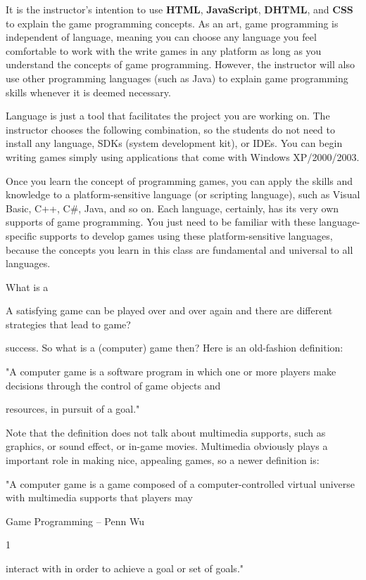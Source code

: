\documentclass[
]{article}
\begin{document}
It is the instructor's intention to use \textbf{HTML},
\textbf{JavaScript}, \textbf{DHTML}, and \textbf{CSS} to explain the
game programming concepts. As an art, game programming is independent of
language, meaning you can choose any language you feel comfortable to
work with the write games in any platform as long as you understand the
concepts of game programming. However, the instructor will also use
other programming languages (such as Java) to explain game programming
skills whenever it is deemed necessary.

Language is just a tool that facilitates the project you are working on.
The instructor chooses the following combination, so the students do not
need to install any language, SDKs (system development kit), or IDEs.
You can begin writing games simply using applications that come with
Windows XP/2000/2003.

Once you learn the concept of programming games, you can apply the
skills and knowledge to a platform-sensitive language (or scripting
language), such as Visual Basic, C++, C\#, Java, and so on. Each
language, certainly, has its very own supports of game programming. You
just need to be familiar with these language-specific supports to
develop games using these platform-sensitive languages, because the
concepts you learn in this class are fundamental and universal to all
languages.

What is a

A satisfying game can be played over and over again and there are
different strategies that lead to game?

success. So what is a (computer) game then? Here is an old-fashion
definition:

"A computer game is a software program in which one or more players make
decisions through the control of game objects and

resources, in pursuit of a goal."

Note that the definition does not talk about multimedia supports, such
as graphics, or sound effect, or in-game movies. Multimedia obviously
plays a important role in making nice, appealing games, so a newer
definition is:

"A computer game is a game composed of a computer-controlled virtual
universe with multimedia supports that players may

Game Programming -- Penn Wu

1

\protect\hypertarget{index_split_001.htmlux5cux23p2}{}{}interact with in
order to achieve a goal or set of goals."
\end{document}
